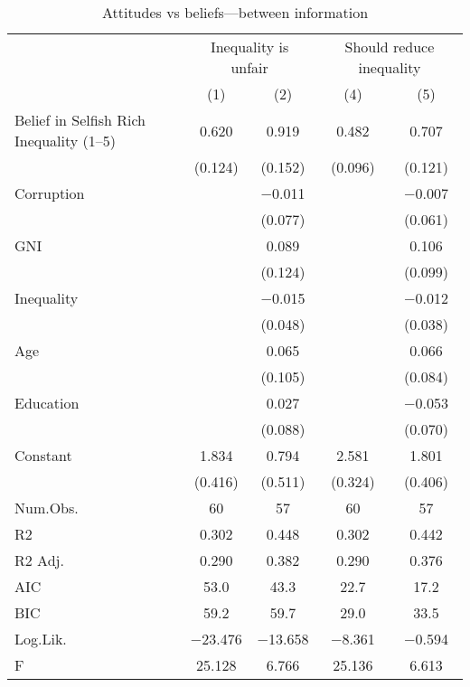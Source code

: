 \begin{table}

\caption{\label{tab:unnamed-chunk-64}Attitudes vs beliefs---between information}
\centering
\begin{tabular}[t]{lcccc}
\toprule
\multicolumn{1}{c}{ } & \multicolumn{2}{c}{Inequality is unfair} & \multicolumn{2}{c}{Should reduce inequality} \\
\cmidrule(l{3pt}r{3pt}){2-3} \cmidrule(l{3pt}r{3pt}){4-5}
  & (1) & (2) & (4) & (5)\\
\midrule
Belief in Selfish Rich Inequality (1--5) & \num{0.620} & \num{0.919} & \num{0.482} & \num{0.707}\\
 & (\num{0.124}) & (\num{0.152}) & (\num{0.096}) & (\num{0.121})\\
Corruption &  & \num{-0.011} &  & \num{-0.007}\\
 &  & (\num{0.077}) &  & (\num{0.061})\\
GNI &  & \num{0.089} &  & \num{0.106}\\
 &  & (\num{0.124}) &  & (\num{0.099})\\
Inequality &  & \num{-0.015} &  & \num{-0.012}\\
 &  & (\num{0.048}) &  & (\num{0.038})\\
Age &  & \num{0.065} &  & \num{0.066}\\
 &  & (\num{0.105}) &  & (\num{0.084})\\
Education &  & \num{0.027} &  & \num{-0.053}\\
 &  & (\num{0.088}) &  & (\num{0.070})\\
Constant & \num{1.834} & \num{0.794} & \num{2.581} & \num{1.801}\\
 & (\num{0.416}) & (\num{0.511}) & (\num{0.324}) & (\num{0.406})\\
\midrule
Num.Obs. & \num{60} & \num{57} & \num{60} & \num{57}\\
R2 & \num{0.302} & \num{0.448} & \num{0.302} & \num{0.442}\\
R2 Adj. & \num{0.290} & \num{0.382} & \num{0.290} & \num{0.376}\\
AIC & \num{53.0} & \num{43.3} & \num{22.7} & \num{17.2}\\
BIC & \num{59.2} & \num{59.7} & \num{29.0} & \num{33.5}\\
Log.Lik. & \num{-23.476} & \num{-13.658} & \num{-8.361} & \num{-0.594}\\
F & \num{25.128} & \num{6.766} & \num{25.136} & \num{6.613}\\
\bottomrule
\end{tabular}
\end{table}